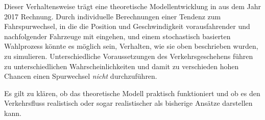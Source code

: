 Dieser Verhaltensweise trägt eine theoretische Modellentwicklung in \cite{dat-ba} aus dem Jahr 2017 Rechnung.
Durch individuelle Berechnungen einer Tendenz zum Fahrspurwechsel, in die die Position und Geschwindigkeit vorausfahrender und nachfolgender Fahrzeuge mit eingehen, und einem stochastisch basierten Wahlprozess könnte es möglich sein, Verhalten, wie sie oben beschrieben wurden, zu simulieren.
Unterschiedliche Voraussetzungen des Verkehrsgeschehens führen zu unterschiedlichen Wahrscheinlichkeiten und damit zu verschieden hohen Chancen einen Spurwechsel \textit{nicht} durchzuführen.

Es gilt zu klären, ob das theoretische Modell praktisch funktioniert und ob es den Verkehrsfluss realistisch oder sogar realistischer als bisherige Ansätze darstellen kann.